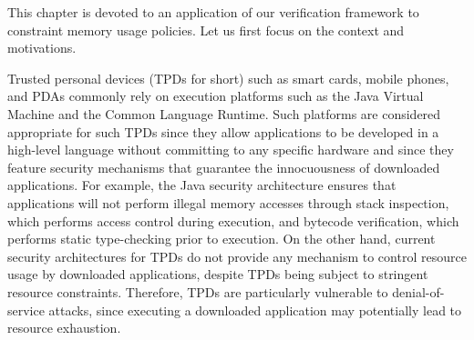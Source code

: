 
This chapter is devoted to an application of our verification framework
to constraint memory usage policies. Let us first focus on 
 the context and motivations.

Trusted personal devices (TPDs for short) such as smart cards,
mobile phones, and PDAs commonly rely on execution platforms such as the Java
Virtual Machine and the Common Language Runtime. Such platforms are
considered appropriate for such TPDs since they allow applications to
be developed in a high-level language without committing to any
specific hardware and since they feature security mechanisms that
guarantee the innocuousness of downloaded applications. For example,
the Java security architecture ensures that applications will not
perform illegal memory accesses through stack inspection, which
performs access control during execution, and bytecode verification,
which performs static type-checking prior to execution.  On the other
hand, current security architectures for TPDs do not provide any
mechanism to control resource usage by downloaded applications,
despite TPDs being subject to stringent resource constraints.
Therefore, TPDs are particularly vulnerable to denial-of-service
attacks, since executing a downloaded application may potentially lead
to resource exhaustion.


